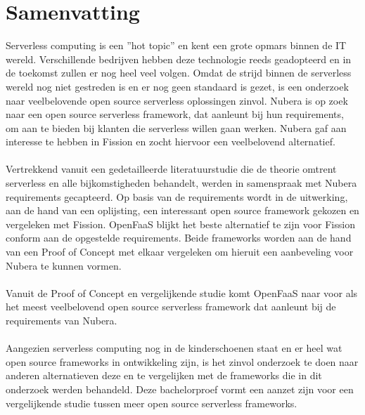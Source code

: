 \chapter*{Samenvatting}
Serverless computing is een ''hot topic'' en kent een grote opmars binnen de IT wereld. Verschillende bedrijven hebben deze technologie reeds geadopteerd en in de toekomst zullen er nog heel veel volgen. Omdat de strijd binnen de serverless wereld nog niet gestreden is en er nog geen standaard is gezet, is een onderzoek naar veelbelovende open source serverless oplossingen zinvol. Nubera is op zoek naar een open source serverless framework, dat aanleunt bij hun requirements, om aan te bieden bij klanten die serverless willen gaan werken. Nubera gaf aan interesse te hebben in Fission en zocht hiervoor een veelbelovend alternatief. 
\\\\
Vertrekkend vanuit een gedetailleerde literatuurstudie die de theorie omtrent serverless en alle bijkomstigheden behandelt, werden in samenspraak met Nubera requirements gecapteerd. Op basis van de requirements wordt in de uitwerking, aan de hand van een oplijsting, een interessant open source framework gekozen en vergeleken met Fission. OpenFaaS blijkt het beste alternatief te zijn voor Fission conform aan de opgestelde requirements. Beide frameworks worden aan de hand van een Proof of Concept met elkaar vergeleken om hieruit een aanbeveling voor Nubera te kunnen vormen. 
\\\\
Vanuit de Proof of Concept en vergelijkende studie komt OpenFaaS naar voor als het meest veelbelovend open source serverless framework dat aanleunt bij de requirements van Nubera.
\\\\
Aangezien serverless computing nog in de kinderschoenen staat en er heel wat open source frameworks in ontwikkeling zijn, is het zinvol onderzoek te doen naar anderen alternatieven deze en te vergelijken met de frameworks die in dit onderzoek werden behandeld. Deze bachelorproef vormt een aanzet zijn voor een vergelijkende studie tussen meer open source serverless frameworks.

